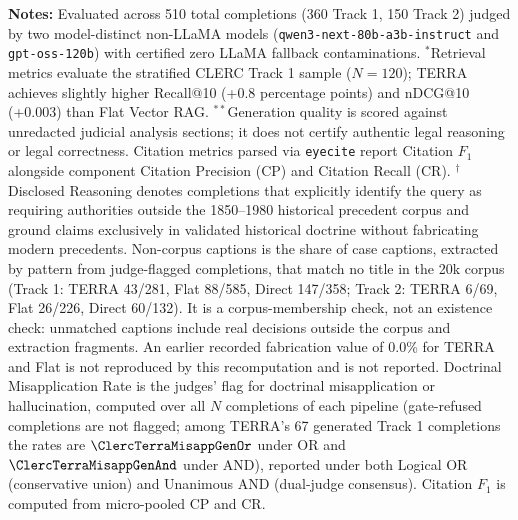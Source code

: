 \raggedright \fontsize{8.5}{10.5}\selectfont \textbf{Notes:} Evaluated across 510 total completions (360 Track 1, 150 Track 2) judged by two model-distinct non-LLaMA models (\texttt{qwen3-\allowbreak{}next-\allowbreak{}80b-\allowbreak{}a3b-\allowbreak{}instruct} and \texttt{gpt-\allowbreak{}oss-\allowbreak{}120b}) with certified zero LLaMA fallback contaminations.
$^*$Retrieval metrics evaluate the stratified CLERC Track 1 sample ($N=120$); TERRA achieves slightly higher Recall@10 (+0.8 percentage points) and nDCG@10 (+0.003) than Flat Vector RAG.
$^{**}$Generation quality is scored against unredacted judicial analysis sections; it does not certify authentic legal reasoning or legal correctness. Citation metrics parsed via \texttt{eyecite} report Citation $F_1$ alongside component Citation Precision (CP) and Citation Recall (CR).
$^\dagger$Disclosed Reasoning denotes completions that explicitly identify the query as requiring authorities outside the 1850--1980 historical precedent corpus and ground claims exclusively in validated historical doctrine without fabricating modern precedents.
Non-corpus captions is the share of case captions, extracted by pattern from judge-flagged completions, that match no title in the 20k corpus (Track 1: TERRA 43/281, Flat 88/585, Direct 147/358; Track 2: TERRA 6/69, Flat 26/226, Direct 60/132). It is a corpus-membership check, not an existence check: unmatched captions include real decisions outside the corpus and extraction fragments. An earlier recorded fabrication value of 0.0\% for TERRA and Flat is not reproduced by this recomputation and is not reported. Doctrinal Misapplication Rate is the judges' flag for doctrinal misapplication or hallucination, computed over all $N$ completions of each pipeline (gate-refused completions are not flagged; among TERRA's 67 generated Track 1 completions the rates are $\ClercTerraMisappGenOr$ under OR and $\ClercTerraMisappGenAnd$ under AND), reported under both Logical OR (conservative union) and Unanimous AND (dual-judge consensus). Citation $F_1$ is computed from micro-pooled CP and CR.
\endgroup






